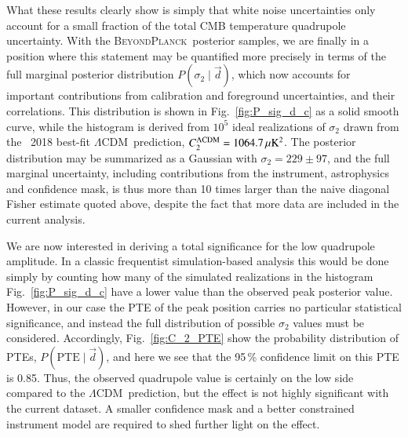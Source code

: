 \documentclass[twocolumn]{aa}
\def\LCDM{$\Lambda$CDM}
\renewcommand{\d}[0]{\vec{d}}
\newcommand{\BP}{\textsc{BeyondPlanck}}
\begin{document}
What these results clearly show is simply that white noise
uncertainties only account for a small fraction of the total CMB
temperature quadrupole uncertainty. With the \BP\ posterior samples,
we are finally in a position where this statement may be quantified
more precisely in terms of the full marginal posterior distribution
$P(\sigma_2\mid\d)$, which now accounts for important contributions from
calibration and foreground uncertainties, and their correlations. This
distribution is shown in Fig.~\ref{fig:P_sig_d_c} as a solid smooth
curve, while the histogram is derived from $10^5$ ideal realizations
of $\sigma_2$ drawn from the \Planck\ 2018 best-fit \LCDM\ prediction,
$C^{\Lambda\mathrm{CDM}}_2 = 1064.7 \muK^2$. The posterior distribution may
be summarized as a Gaussian with $\sigma_2=229\pm97$, and the full marginal uncertainty,
including contributions from the instrument, astrophysics and
confidence mask, is thus more than 10 times larger than the naive
diagonal Fisher estimate quoted above, despite the fact that more data
are included in the current analysis.

We are now interested in deriving a total significance for the low
quadrupole amplitude. In a classic frequentist simulation-based
analysis this would be done simply by counting how many of the
simulated realizations in the histogram Fig.~\ref{fig:P_sig_d_c} have
a lower value than the observed peak posterior value. However, in our
case the PTE of the peak position carries no particular statistical
significance, and instead the full distribution of possible $\sigma_2$
values must be considered. Accordingly, Fig.~\ref{fig:C_2_PTE} show
the probability distribution of PTEs, $P(\mathrm{PTE}\mid\d)$, and here
we see that the 95\,\% confidence limit on this PTE is 0.85. Thus, the
observed quadrupole value is certainly on the low side compared to the
\LCDM\ prediction, but the effect is not highly significant with the
current dataset. A smaller confidence mask and a better constrained
instrument model are required to shed further light on the effect.
\end{document}
